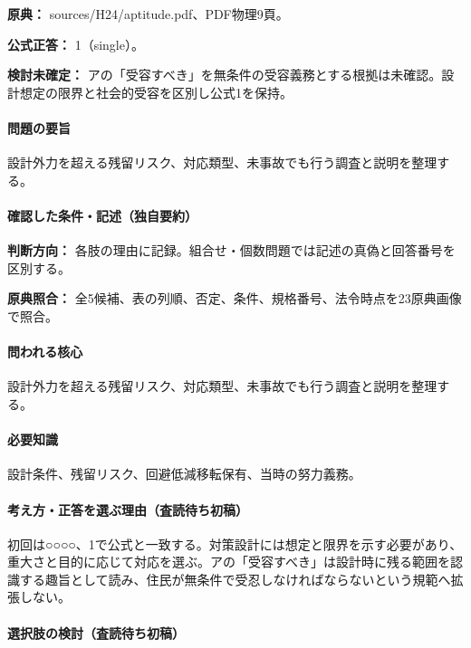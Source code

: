 \noindent\textbf{原典：} sources/H24/aptitude.pdf、PDF物理9頁。

\textbf{公式正答：} 1（single）。

\par\textbf{検討未確定：} アの「受容すべき」を無条件の受容義務とする根拠は未確認。設計想定の限界と社会的受容を区別し公式1を保持。

\paragraph{問題の要旨} 設計外力を超える残留リスク、対応類型、未事故でも行う調査と説明を整理する。

\paragraph{確認した条件・記述（独自要約）}\mbox{}\par

\noindent\textbf{判断方向：} 各肢の理由に記録。組合せ・個数問題では記述の真偽と回答番号を区別する。\par

\noindent\textbf{原典照合：} 全5候補、表の列順、否定、条件、規格番号、法令時点を23原典画像で照合。\par

\paragraph{問われる核心} 設計外力を超える残留リスク、対応類型、未事故でも行う調査と説明を整理する。

\paragraph{必要知識} 設計条件、残留リスク、回避低減移転保有、当時の努力義務。

\paragraph{考え方・正答を選ぶ理由（査読待ち初稿）} 初回は○○○○、1で公式と一致する。対策設計には想定と限界を示す必要があり、重大さと目的に応じて対応を選ぶ。アの「受容すべき」は設計時に残る範囲を認識する趣旨として読み、住民が無条件で受忍しなければならないという規範へ拡張しない。

\paragraph{選択肢の検討（査読待ち初稿）}\mbox{}\par

